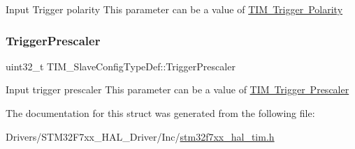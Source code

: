 Input Trigger polarity This parameter can be a value of \mbox{\hyperlink{group___t_i_m___trigger___polarity}{T\+IM Trigger Polarity}} \mbox{\label{struct_t_i_m___slave_config_type_def_a57be6d41d77a968f1daeac7b65b1ab4c}} 
\subsubsection{\texorpdfstring{TriggerPrescaler}{TriggerPrescaler}}
{\footnotesize\ttfamily uint32\+\_\+t T\+I\+M\+\_\+\+Slave\+Config\+Type\+Def\+::\+Trigger\+Prescaler}

Input trigger prescaler This parameter can be a value of \mbox{\hyperlink{group___t_i_m___trigger___prescaler}{T\+IM Trigger Prescaler}} 

The documentation for this struct was generated from the following file\+:\begin{DoxyCompactItemize}
\item 
Drivers/\+S\+T\+M32\+F7xx\+\_\+\+H\+A\+L\+\_\+\+Driver/\+Inc/\mbox{\hyperlink{stm32f7xx__hal__tim_8h}{stm32f7xx\+\_\+hal\+\_\+tim.\+h}}\end{DoxyCompactItemize}
